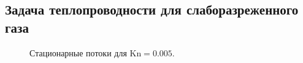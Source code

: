 \documentclass[a4paper,10pt]{article}
\newcommand{\Kn}{\mathrm{Kn}}
\begin{document}
\subsection{Задача теплопроводности для слаборазреженного газа}
\begin{figure}[h]
	\caption{Стационарные потоки для \(\Kn=0.005\).}\label{fig:flows_dens}
\end{figure}
\end{document}

